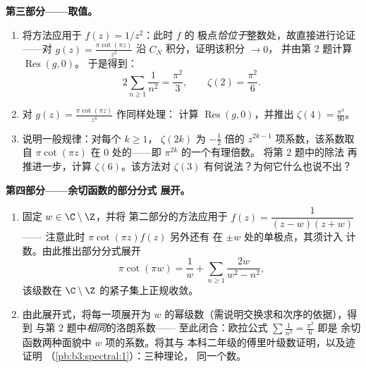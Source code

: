 \begin{problem}
\medskip
\noindent\textbf{第三部分——取值。}
\begin{enumerate}[resume]
  \item 将方法应用于 $f(z) = 1/z^2$：此时 $f$ 的
        极点\emph{恰位于}整数处，故直接进行论证
——对 $g(z) = \frac{\pi\cot(\pi
        z)}{z^2}$ 沿 $C_N$ 积分，证明该积分 $\to 0$，
        并由第 2 题计算 $\operatorname{Res}(g, 0)$。
        于是得到：
        \[
        2\sum_{n\geq1}\frac1{n^2} = \frac{\pi^2}{3},
        \qquad \zeta(2) = \frac{\pi^2}6 .
        \]
  \item 对 $g(z) = \frac{\pi\cot(\pi z)}{z^4}$ 作同样处理：
        计算 $\operatorname{Res}(g, 0)$，并推出
        $\zeta(4) = \frac{\pi^4}{90}$。
  \item 说明一般规律：对每个 $k \geq 1$，
        $\zeta(2k)$ 为 $-\frac12$ 倍的
        $z^{2k-1}$ 项系数，该系数取自 $\pi\cot(\pi
        z)$ 在 $0$ 处的——即 $\pi^{2k}$ 的一个有理倍数。
        将第 2 题中的除法
        再推进一步，计算 $\zeta(6)$。该方法对
        $\zeta(3)$ 有何说法？为何它什么也说不出？
\end{enumerate}

\medskip
\noindent\textbf{第四部分——余切函数的部分分式
展开。}
\begin{enumerate}[resume]
  \item 固定 $w \in \C\setminus\Z$，并将
        第二部分的方法应用于 $f(z) = \dfrac{1}{(z - w)(z + w)}$——
        注意此时 $\pi\cot(\pi z)f(z)$ 另外还有
        在 $\pm w$ 处的单极点，其须计入
        计数。由此推出部分分式展开
        \[
        \pi\cot(\pi w) = \frac1w +
        \sum_{n\geq1}\frac{2w}{w^2 - n^2},
        \]
        该级数在
        $\C\setminus\Z$ 的紧子集上正规收敛。
  \item 由此展开式，将每一项展开为
        $w$ 的幂级数（需说明交换求和次序的依据），得到
        与第 2 题中\emph{相同}的洛朗系数——
        至此闭合：欧拉公式
        $\sum\frac1{n^2} = \frac{\pi^2}6$ 即是
        余切函数两种面貌中 $w$ 项的系数。将其与
        本科二年级的傅里叶级数证明，以及迹证明
        （\cref{pb:b3:spectral:1}）：三种理论，
        同一个数。
\end{enumerate}


\end{problem}
